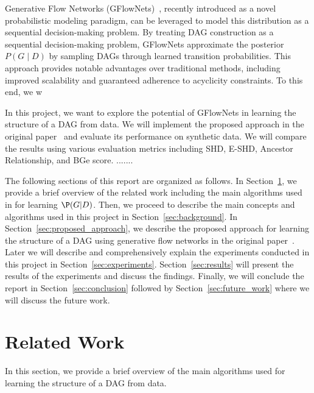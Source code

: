 \documentclass{lxaiproposal}
\begin{document}
    Generative Flow Networks (GFlowNets)~\cite{bengio2023gflownetfoundations}, recently introduced as a novel
    probabilistic modeling paradigm, can be leveraged to model this distribution as a sequential decision-making
    problem. By treating DAG construction as a sequential decision-making problem, GFlowNets approximate the
    posterior $P(G\mid D)$ by sampling DAGs through learned transition probabilities. This approach provides notable
    advantages over traditional methods, including improved scalability and guaranteed adherence to acyclicity
    constraints. To this end, we w

    In this project, we want to explore the potential of GFlowNets in learning the structure of a DAG from data. We
    will implement the proposed approach in the original paper~\cite{deleu2022daggflownet} and evaluate its performance
    on synthetic data. We will compare the results using various evaluation metrics including SHD, E-SHD, Ancestor
    Relationship, and BGe score.
    .......

    The following sections of this report are organized as follows. In Section~\ref{sec:related_work}, we provide a
    brief overview of the related work including the main algorithms used in for learning $\P(G|D)$. Then, we proceed
    to describe the main concepts and algorithms used in this project in Section~\ref{sec:background}. In Section~\ref{sec:proposed_approach},
    we describe the proposed approach for learning the structure of a DAG using generative flow networks in the
    original paper~\cite{deleu2022daggflownet}. Later we will describe and comprehensively explain the experiments
    conducted in this project in Section~\ref{sec:experiments}. Section~\ref{sec:results} will present the results of the
    experiments and discuss the findings. Finally, we will conclude the report in Section~\ref{sec:conclusion}
    followed by Section~\ref{sec:future_work} where we will discuss the future work.


    \section{Related Work}\label{sec:related_work}
    \vspace*{-3mm}

    In this section, we provide a brief overview of the main algorithms used for learning the structure of a DAG from
    data.
\end{document}
